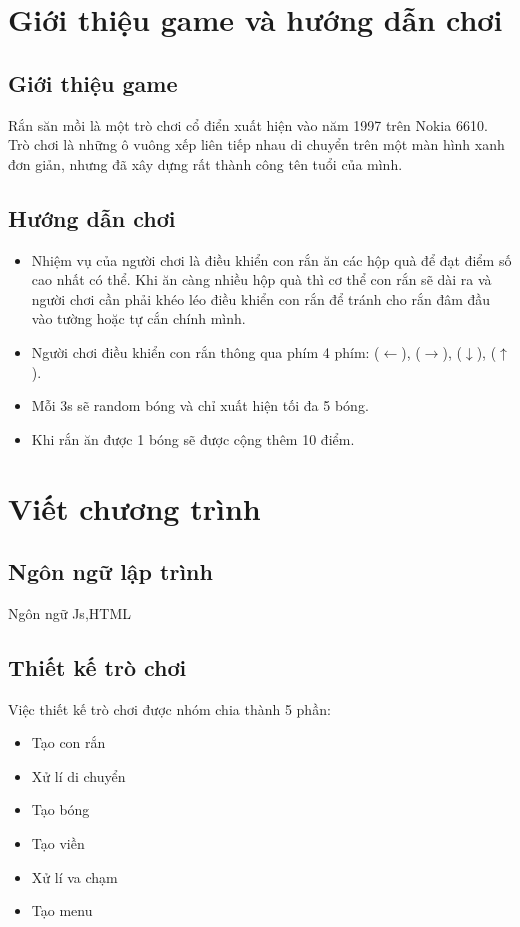 \documentclass[../main-report.tex]{subfiles}
\begin{document}
\section{Giới thiệu game và hướng dẫn chơi}
\subsection{Giới thiệu game}
Rắn săn mồi là một trò chơi cổ điển xuất hiện vào năm 1997 trên Nokia 6610. Trò chơi là những ô vuông xếp liên tiếp nhau di chuyển trên một màn hình xanh đơn giản, nhưng đã xây dựng rất thành công tên tuổi của mình.

\subsection{Hướng dẫn chơi}

\begin{itemize}
\item Nhiệm vụ của người chơi là điều khiển con rắn ăn các hộp quà để đạt điểm số cao nhất có thể. Khi ăn càng nhiều hộp quà thì cơ thể con rắn sẽ dài ra và người chơi cần phải khéo léo điều khiển con rắn để tránh cho rắn đâm đầu vào tường hoặc tự cắn chính mình.
\end{itemize}

\begin{itemize}
\item Người chơi điều khiển con rắn thông qua phím 4 phím:  ($\leftarrow$),  ($\rightarrow$),  ($\downarrow$),  ($\uparrow$).
\end{itemize}
\begin{itemize}
\item Mỗi 3s sẽ random bóng và chỉ xuất hiện tối đa 5 bóng.
\item Khi rắn ăn được 1 bóng sẽ được cộng thêm 10 điểm.
\end{itemize}
\section{Viết chương trình}
\subsection{Ngôn ngữ lập trình}
Ngôn ngữ Js,HTML
\subsection{Thiết kế trò chơi}
Việc thiết kế trò chơi được nhóm chia thành 5 phần:
\begin{itemize}
    \item Tạo con rắn
    \item Xử lí di chuyển
    \item Tạo bóng
    \item Tạo viền
    \item Xử lí va chạm
    \item Tạo menu
\end{itemize}
\end{document}
